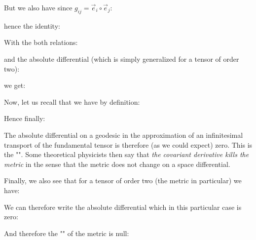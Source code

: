 	But we also have since $g_{ij}=\vec{e}_i\circ\vec{e}_j$:
	
	hence the identity:
	
	With the both relations:
	
	and the absolute differential (which is simply generalized for a tensor of order two):
	
	we get:
	
	Now, let us recall that we have by definition:
	
	Hence finally:
	
	The absolute differential on a geodesic in the approximation of an infinitesimal transport of the fundamental tensor is therefore (as we could expect) zero. This is the "". Some theoretical physicists then say that \textit{the covariant derivative kills the metric} in the sense that the metric does not change on a space differential.

	Finally, we also see that for a tensor of order two (the metric in particular) we have:
	
	We can therefore write the absolute differential which in this particular case is zero:
	
	And therefore the "" of the metric is null:
	
